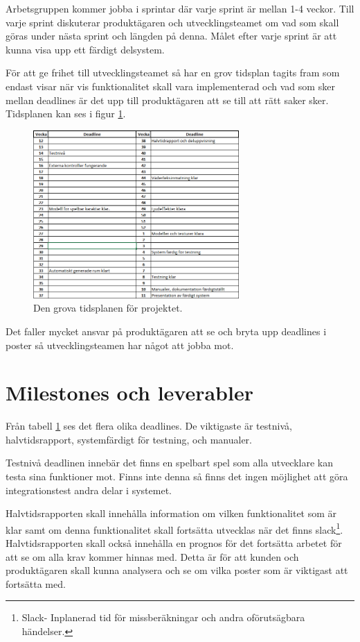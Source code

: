 \documentclass[a4paper,12pt,oneside,final]{extbook}
\begin{document}
Arbetsgruppen kommer jobba i sprintar där varje sprint är mellan 1-4 veckor. Till varje sprint diskuterar produktägaren och utvecklingsteamet om vad som skall göras under nästa sprint och längden på denna. Målet efter varje sprint är att kunna visa upp ett färdigt delsystem. 

För att ge frihet till utvecklingsteamet så har en grov tidsplan tagits fram som endast visar när vis funktionalitet skall vara implementerad och vad som sker mellan deadlines är det upp till produktägaren att se till att rätt saker sker.  Tidsplanen kan ses i figur \ref{fig:tidsplan}.

\begin{figure}[H]
	\includegraphics[width=0.7\textwidth, center]{tidsplan.jpg}
	\caption{Den grova tidsplanen för projektet.}
	\label{fig:tidsplan}
\end{figure}
Det faller mycket ansvar på produktägaren att se och bryta upp deadlines i poster så utvecklingsteamen har något att jobba mot.


\section{Milestones och leverabler}
 Från tabell \ref{fig:tidsplan} ses det flera olika deadlines. De viktigaste är testnivå, halvtidsrapport, systemfärdigt för testning, och manualer.
 
 Testnivå deadlinen innebär det finns en spelbart spel som alla utvecklare kan testa sina funktioner mot. Finns inte denna så finns det ingen möjlighet att göra integrationstest andra delar i systemet.
 
 Halvtidsrapporten skall innehålla information om vilken funktionalitet som är klar samt om denna funktionalitet skall fortsätta utvecklas när det finns slack\footnote{Slack- Inplanerad tid för missberäkningar och andra oförutsägbara händelser.}. Halvtidsrapporten skall också innehålla en prognos för det fortsätta arbetet för att se om alla krav kommer hinnas med. Detta är för att kunden och produktägaren skall kunna analysera och se om vilka poster som är viktigast att fortsätta med.
 
\end{document}

